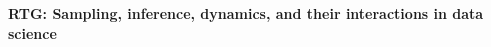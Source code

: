 \documentclass[11pt]{NSFamsart}
\begin{document}
  

\centerline{\large \textbf{RTG: Sampling, inference,  dynamics, and their interactions in data science}}

\begin{comment}
\section*{\color{magenta}Action items list:}

{\color{magenta}BUDGET NOTES: \\
* 5 postdocs (hire 2 in 1st year, 1 in 2nd year, 2 in 3rd year); \\
* 1-2 weeks summer salary for one PI per year - Chun in year1, others rotate after;\\
* PhD: 2 per year = total 10;\\
* undergrads: 6 per year -- this includes SoReMo fellows FROM MATH (AY UG); plus SURE (SUmmer UG); \\
* Rob's I-course funding for students - TA grad student training for this course (applied data science!);\\
* Despina's training module for student research project proposals --about 10K per year; \\
* ... 
}
* \sout{update title of the proposal LOL} 

* \sout{remove Duan from the proposal}

* \sout{add Sonja's research section draft}

* \sout{rewrite and polish Sonja's research section draft.  Work-in the joint work with the discrete group.} Polish Thrust 2 Sonja-Hemanshu-Micheal part.

* \sout{*Sonja will also add Rob in the context of I-course (grad student training for this course (applied data science!)); Despina and Gorjana to SoReMo and training* Despina's training module for student research project proposals } --about 10K per year?? this is coming out as summer salary for SPs;

* Yuhan will be senior personnel in the context of SURE. 


* \sout{[THIS GOT LOST DURING THE SUMMER] Sonja, see line 171 \& 175 for code comments from the solicitation!!  and 189.}

* Emphasize that our proposal includes senior, junior and NTT (teaching) faculty. 

* Add KI's enterpreneurship collaborations for students and open to postdocs - which is something unique to IIT, I think. 

* the rest of the text all needs updates, both quant and qual. :D 

* Introduction will be edited LAST. 
\end{comment}
\end{document}
